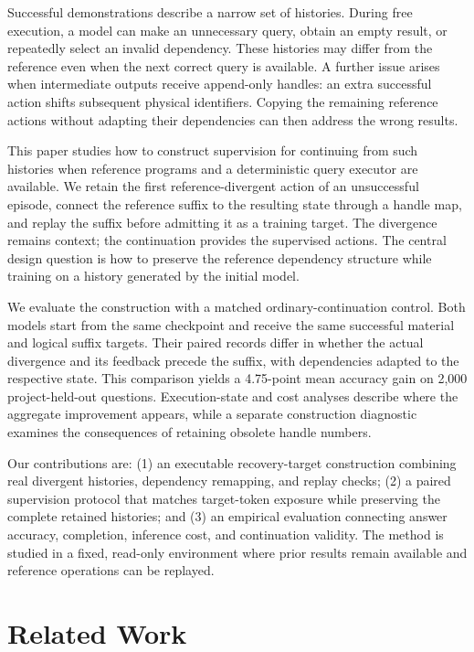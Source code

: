 \documentclass[a4paper,12pt]{article}
\begin{document}
Successful demonstrations describe a narrow set of histories. During free execution, a model can make an unnecessary query, obtain an empty result, or repeatedly select an invalid dependency. These histories may differ from the reference even when the next correct query is available. A further issue arises when intermediate outputs receive append-only handles: an extra successful action shifts subsequent physical identifiers. Copying the remaining reference actions without adapting their dependencies can then address the wrong results.

This paper studies how to construct supervision for continuing from such histories when reference programs and a deterministic query executor are available. We retain the first reference-divergent action of an unsuccessful episode, connect the reference suffix to the resulting state through a handle map, and replay the suffix before admitting it as a training target. The divergence remains context; the continuation provides the supervised actions. The central design question is how to preserve the reference dependency structure while training on a history generated by the initial model.

We evaluate the construction with a matched ordinary-continuation control. Both models start from the same checkpoint and receive the same successful material and logical suffix targets. Their paired records differ in whether the actual divergence and its feedback precede the suffix, with dependencies adapted to the respective state. This comparison yields a 4.75-point mean accuracy gain on 2,000 project-held-out questions. Execution-state and cost analyses describe where the aggregate improvement appears, while a separate construction diagnostic examines the consequences of retaining obsolete handle numbers.

Our contributions are: (1) an executable recovery-target construction combining real divergent histories, dependency remapping, and replay checks; (2) a paired supervision protocol that matches target-token exposure while preserving the complete retained histories; and (3) an empirical evaluation connecting answer accuracy, completion, inference cost, and continuation validity. The method is studied in a fixed, read-only environment where prior results remain available and reference operations can be replayed.

\section{Related Work}
\end{document}
